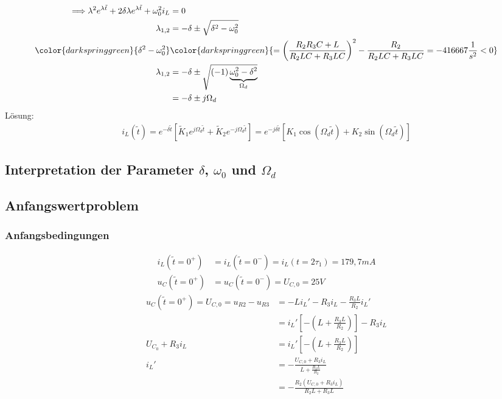 \documentclass[11pt]{scrartcl}
\begin{document}
\begin{align*}
  \Longrightarrow \lambda^{2} e^{\lambda \tilde{t}} + 2 \delta \lambda e^{\lambda \tilde{t}} + \omega_{0}^{2} i_{L} &= 0 \\
  \lambda_{1,2} &= -\delta \pm \sqrt{\delta^{2} - \omega_{0}^{2}} \\
  \color{darkspringgreen}{\delta^{2} - \omega_{0}^{2}} &{\color{darkspringgreen}{= \left( \frac{R_{2} R_{3} C + L}{R_{2}LC + R_{3}LC} \right)^{2} - \frac{R_{2}}{R_{2}LC + R_{3}LC} = - 416667 \frac{1}{s^{2}} < 0}} \\
  \lambda_{1,2} &= -\delta \pm \sqrt{(-1) \underbrace{\omega_{0}^{2} - \delta^{2}}_{\Omega_{d}}} \\
              &= -\delta \pm j \Omega_{d}
\end{align*}
Lösung:
\begin{align*}
  i_{L}(\tilde{t}) = e^{-\delta \tilde{t}} \left[ \tilde{K}_{1} e^{j\Omega_{d}\tilde{t}} + \tilde{K}_{2} e^{-j\Omega_{d} \tilde{t}}\right] = e^{-j\delta \tilde{t}} \left[ K_{1} \cos(\Omega_{d} \tilde{t}) + K_{2} \sin (\Omega_{d} \tilde{t})\right]
\end{align*}
\subsection{Interpretation der Parameter $\delta$,  $\omega_0$ und $\Omega_d$}%
\subsection{Anfangswertproblem}%
\subsubsection{Anfangsbedingungen}%
\begin{align*}
  i_{L}(\tilde{t} = 0^{+}) &= i_{L}(\tilde{t} = 0^{-}) = i_{L}(t=2\tau_{1}) = 179,7 \unit{mA} \\
  u_{C}(\tilde{t} = 0^{+}) &= u_{C}(\tilde{t} = 0^{-}) = U_{C,0} = 25 \unit{V}
\end{align*}
\begin{align*}
  u_{C}(\tilde{t} = 0^{+})=U_{C,0} = u_{R2} -u_{R3} &= -L i_{L}' -R_{3}i_{L}-\frac{R_{3}L}{R_{2}} i_{L}' \\
                                            &= i_{L}' \left[ -\left( L +    \frac{R_{3}L}{R_{2}}\right)\right] - R_{3}i_{L} \\
  U_{C_{0}} + R_{3}i_{L} &= i_{L}'\left[ -\left( L + \frac{R_{3}L}{R_{2}}\right)\right] \\
  i_{L}' &= - \frac{U_{C,0} + R_{3}i_{L}}{L + \frac{R_{3}L}{R_{2}}} \\
        &= - \frac{R_{2} (U_{C,0} + R_{3} i_{L})}{R_{2}L + R_{3}L}
\end{align*}
\end{document}
